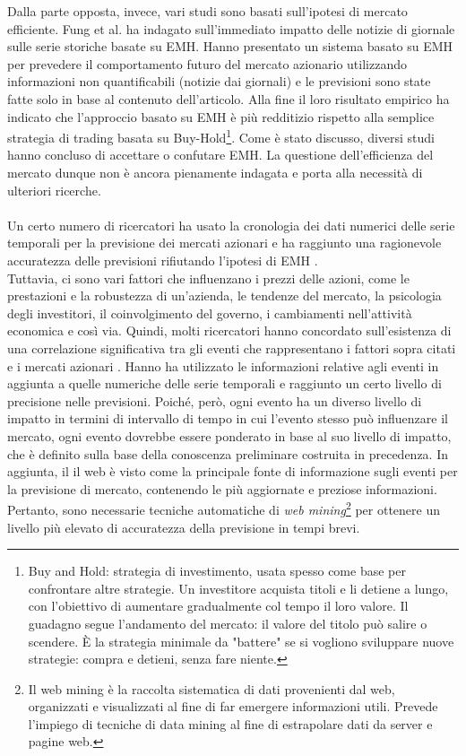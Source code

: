 \documentclass[a4paper,12pt]{report}
\begin{document}
Dalla parte opposta, invece, vari studi sono basati sull'ipotesi di mercato efficiente. Fung et al. \cite{news-nn} ha indagato sull'immediato impatto delle notizie di giornale sulle serie storiche basate su EMH. Hanno presentato un sistema basato su EMH per prevedere il comportamento futuro del mercato azionario utilizzando informazioni non quantificabili (notizie dai giornali) e le previsioni sono state fatte solo in base al contenuto dell'articolo. Alla fine il loro risultato empirico ha indicato che l'approccio basato su EMH è più redditizio rispetto alla semplice strategia di trading basata su Buy-Hold\footnote{Buy and Hold: strategia di investimento, usata spesso come base per confrontare altre strategie. Un investitore acquista titoli e li detiene a lungo, con l'obiettivo di aumentare gradualmente col tempo il loro valore. Il guadagno segue l'andamento del mercato: il valore del titolo può salire o scendere. È la strategia minimale da "battere" se si vogliono sviluppare nuove strategie: compra e detieni, senza fare niente.}. Come è stato discusso, diversi studi hanno concluso di accettare o confutare EMH. La questione dell'efficienza del mercato dunque non è ancora pienamente indagata e porta alla necessità di ulteriori ricerche.\\~\\
Un certo numero di ricercatori ha usato la cronologia dei dati numerici delle serie temporali per la previsione dei mercati azionari e ha raggiunto una ragionevole accuratezza delle previsioni rifiutando l'ipotesi di EMH \cite{nn-eyden}\cite{emh0}.\\Tuttavia, ci sono vari fattori che influenzano i prezzi delle azioni, come le prestazioni e la robustezza di un'azienda, le tendenze del mercato, la psicologia degli investitori, il coinvolgimento del governo, i cambiamenti nell'attività economica e così via. Quindi, molti ricercatori hanno concordato sull'esistenza di una correlazione significativa tra gli eventi che rappresentano i fattori sopra citati e i mercati azionari \cite{news-nn}\cite{know-nn2}. Hanno ha utilizzato le informazioni relative agli eventi in aggiunta a quelle numeriche delle serie temporali e raggiunto un certo livello di precisione nelle previsioni. Poiché, però, ogni evento ha un diverso livello di impatto in termini di intervallo di tempo in cui l'evento stesso può influenzare il mercato, ogni evento dovrebbe essere ponderato in base al suo livello di impatto, che è definito sulla base della conoscenza preliminare costruita in precedenza. In aggiunta, il il web è visto come la principale fonte di informazione sugli eventi per la previsione di mercato, contenendo le più aggiornate e preziose informazioni. Pertanto, sono necessarie tecniche automatiche di \textit{web mining}\footnote{Il web mining è la raccolta sistematica di dati provenienti dal web, organizzati e visualizzati al fine di far emergere informazioni utili. Prevede l'impiego di tecniche di data mining al fine di estrapolare dati da server e pagine web.} per ottenere un livello più elevato di accuratezza della previsione in tempi brevi.
\end{document}
